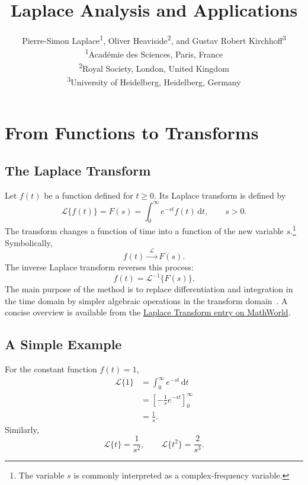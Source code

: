 \documentclass[11pt]{article}
\title{Laplace Analysis and Applications}
\author{Pierre-Simon Laplace\textsuperscript{1}, Oliver Heaviside\textsuperscript{2},
        and Gustav Robert Kirchhoff\textsuperscript{3}\\[0.6em]
        \textsuperscript{1}Acad\'emie des Sciences, Paris, France\\
        \textsuperscript{2}Royal Society, London, United Kingdom\\
        \textsuperscript{3}University of Heidelberg, Heidelberg, Germany}
\date{}
\begin{document}
\maketitle

\section{From Functions to Transforms}

\subsection{The Laplace Transform}
Let $f(t)$ be a function defined for $t \ge 0$. Its Laplace transform is defined by
\begin{equation}\label{eq:def}
    \mathcal{L}\{f(t)\} = F(s) = \int_0^\infty e^{-st} f(t)\,\mathrm{d}t, \qquad s > 0.
\end{equation}
The transform changes a function of time into a function of the new variable
$s$.\footnote{The variable $s$ is commonly interpreted as a complex-frequency
variable.} Symbolically,
\[
    f(t) \xrightarrow{\ \ \mathcal{L}\ \ } F(s).
\]
The inverse Laplace transform reverses this process:
\begin{equation}
    f(t) = \mathcal{L}^{-1}\{F(s)\}.
\end{equation}
The main purpose of the method is to replace differentiation and integration in
the time domain by simpler algebraic operations in the transform
domain~\cite{kreyszig2011}. A concise overview is available from the
\href{https://mathworld.wolfram.com/LaplaceTransform.html}{Laplace Transform entry
on MathWorld}.

\subsection{A Simple Example}
For the constant function $f(t) = 1$,
\begin{equation}
    \begin{split}
        \mathcal{L}\{1\} &= \int_0^\infty e^{-st}\,\mathrm{d}t \\
                         &= \left[-\frac{1}{s} e^{-st}\right]_0^\infty \\
                         &= \frac{1}{s}.
    \end{split}
\end{equation}
Similarly,
\begin{equation}
    \mathcal{L}\{t\} = \frac{1}{s^2}, \qquad \mathcal{L}\{t^2\} = \frac{2}{s^3}.
\end{equation}
\end{document}
